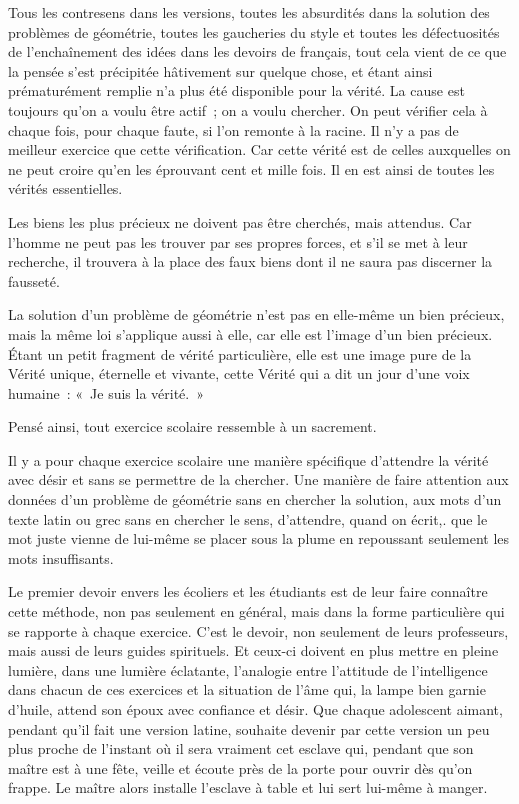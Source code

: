 \documentclass[french,twoside]{book} %
\begin{document}
Tous les contresens dans les versions, toutes les absurdités dans la solution des problèmes de géométrie, toutes les gaucheries du style et toutes les défectuosités de l'enchaînement des idées dans les devoirs de français, tout cela vient de ce que la pensée s'est précipitée hâtivement sur quelque chose, et étant ainsi prématurément remplie n'a plus été disponible pour la vérité. La cause est toujours qu'on a voulu être actif ; on a voulu chercher. On peut vérifier cela à chaque fois, pour chaque faute, si l'on remonte à la racine. Il n'y a pas de meilleur exercice que cette vérification. Car cette vérité est de celles auxquelles on ne peut croire qu'en les éprouvant cent et mille fois. Il en est ainsi de toutes les vérités essentielles.\par
Les biens les plus précieux ne doivent pas être cherchés, mais attendus. Car l'homme ne peut pas les trouver par ses propres forces, et s'il se met à leur recherche, il trouvera à la place des faux biens dont il ne saura pas discerner la fausseté.\par
La solution d'un problème de géométrie n'est pas en elle-même un bien précieux, mais la même loi s'applique aussi à elle, car elle est l'image d'un bien précieux. Étant un petit fragment de vérité particulière, elle est une image pure de la Vérité unique, éternelle et vivante, cette Vérité qui a dit un jour d'une voix humaine : « Je suis la vérité. »\par
Pensé ainsi, tout exercice scolaire ressemble à un sacrement.\par
Il y a pour chaque exercice scolaire une manière spécifique d'attendre la vérité avec désir et sans se permettre de la chercher. Une manière de faire attention aux données d'un problème de géométrie sans en chercher la solution, aux mots d'un texte latin ou grec sans en chercher le sens, d'attendre, quand on écrit,. que le mot juste vienne de lui-même se placer sous la plume en repoussant seulement les mots insuffisants.\par
Le premier devoir envers les écoliers et les étudiants est de leur faire connaître cette méthode, non pas seulement en général, mais dans la forme particulière qui se rapporte à chaque exercice. C'est le devoir, non seulement de leurs professeurs, mais aussi de leurs guides spirituels. Et ceux-ci doivent en plus mettre en pleine lumière, dans une lumière éclatante, l'analogie entre l'attitude de l'intelligence dans chacun de ces exercices et la situation de l'âme qui, la lampe bien garnie d'huile, attend son époux avec confiance et désir. Que chaque adolescent aimant, pendant qu'il fait une version latine, souhaite devenir par cette version un peu plus proche de l'instant où il sera vraiment cet esclave qui, pendant que son maître est à une fête, veille et écoute près de la porte pour ouvrir dès qu'on frappe. Le maître alors installe l'esclave à table et lui sert lui-même à manger.\par
\end{document}
